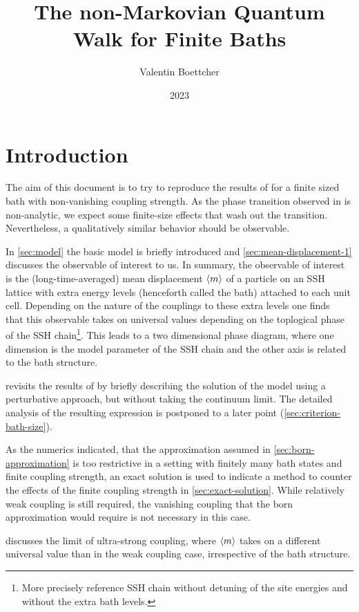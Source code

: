 \documentclass[fontsize=10pt,paper=b5,open=any,
twoside=no,toc=listof,toc=bibliography,headings=optiontohead,
captions=nooneline,captions=tableabove,english,DIV=15,numbers=noenddot,final,parskip=half-,
headinclude=true,footinclude=false,BCOR=0mm]{scrartcl}
\author{Valentin Boettcher}
\title{The non-Markovian Quantum Walk for Finite Baths}
\date{2023}
\begin{document}
\maketitle
\tableofcontents


\section{Introduction}
\label{sec:introduction}
The aim of this document is to try to reproduce the results of
\cite{Ricottone2020} for a finite sized bath with non-vanishing
coupling strength. As the phase transition observed in
 is non-analytic, we expect some finite-size
effects that wash out the transition. Nevertheless, a qualitatively
similar behavior should be observable.

In \cref{sec:model} the basic model is briefly introduced and
\cref{sec:mean-displacement-1} discusses the observable of interest to
us. In summary, the observable of interest is the (long-time-averaged)
mean displacement \(\ev{m}\) of a particle on an SSH lattice with
extra energy levels (henceforth called the bath) attached to each unit
cell. Depending on the nature of the couplings to these extra levels
one finds~\cite{Ricottone2020} that this observable takes on universal
values depending on the toplogical phase of the SSH
chain\footnote{More precisely reference SSH chain without detuning of
  the site energies and without the extra bath levels.}. This leads to
a two dimensional phase diagram, where one dimension is the model
parameter of the SSH chain and the other axis is related to the bath
structure.

 revisits the results of
 by briefly describing the solution of the
model using a perturbative approach, but without taking the continuum
limit. The detailed analysis of the resulting expression is postponed
to a later point (\cref{sec:criterion-bath-size}).

As the numerics indicated, that the approximation assumed in
\cref{sec:born-approximation} is too restrictive in a setting with
finitely many bath states and finite coupling strength, an exact
solution is used to indicate a method to counter the effects of the
finite coupling strength in \cref{sec:exact-solution}. While
relatively weak coupling is still required, the vanishing coupling
that the born approximation would require is not necessary in this
case.

 discusses the limit of ultra-strong
coupling, where \(\ev{m}\) takes on a different universal value than
in the weak coupling case, irrespective of the bath structure.
\end{document}
